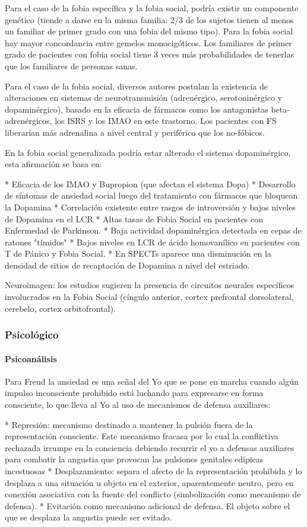 Para el caso de la fobia específica y la fobia social, podría existir un componente genético (tiende a darse en la misma familia: 2/3 de los sujetos tienen al menos un familiar de primer grado con una fobia del mismo tipo). Para la fobia social hay mayor concordancia entre gemelos monocigóticos. Los familiares de primer grado de pacientes con fobia social tiene 3 veces más probabilidades de tenerlas que los familiares de personas sanas.

Para el caso de la fobia social, diversos autores postulan la existencia de alteraciones en sistemas de neurotransmisión (adrenérgico, serotoninérgico y dopaminérgico), basado en la eficacia de fármacos como los antagonistas beta-adrenérgicos, los ISRS y los IMAO en este trastorno. Los pacientes con FS liberarían más adrenalina a nivel central y periférico que los no-fóbicos.

En la fobia social generalizada podría estar alterado el sistema dopaminérgico, esta afirmación se basa en:

* Eficacia de los IMAO y Bupropion (que afectan el sistema Dopa)
* Desarrollo de síntomas de ansiedad social luego del tratamiento con fármacos que bloquean la Dopamina
* Correlación existente entre rasgos de introversión y bajos niveles de Dopamina en el LCR
* Altas tasas de Fobia Social en pacientes con Enfermedad de Parkinson.
* Baja actividad dopaminérgica detectada en cepas de ratones "tímidos"
* Bajos niveles en LCR de ácido homovanílico en pacientes con T de Pánico y Fobia Social.
* En SPECTs aparece una disminución en la densidad de sitios de recaptación de Dopamina a nivel del estriado.

Neuroimagen: los estudios sugieren la presencia de circuitos neurales específicos involucrados en la Fobia Social (cíngulo anterior, cortex prefrontal dorsolateral, cerebelo, cortex orbitofrontal).
\subsubsection*{Psicológico}
\paragraph{Psicoanálisis}
Para Freud la ansiedad es una señal del Yo que se pone en marcha cuando algún impulso inconsciente prohibido está luchando para expresarse en forma consciente, lo que lleva al Yo al uso de mecanismos de defensa auxiliares:

* Represión: mecanismo destinado a mantener la pulsión fuera de la representación consciente. Este mecanismo fracasa por lo cual la conflictiva rechazada irrumpe en la conciencia debiendo recurrir el yo a defensas auxiliares para combatir la angustia que provocan las pulsiones genitales edípicas incestuosas
* Desplazamiento: separa el afecto de la representación prohibida y lo desplaza a una situación u objeto en el exterior, aparentemente neutro, pero en conexión asociativa con la fuente del conflicto (simbolización como mecanismo de defensa).
* Evitación como mecanismo adicional de defensa. El objeto sobre el que se desplaza la angustia puede ser evitado.

